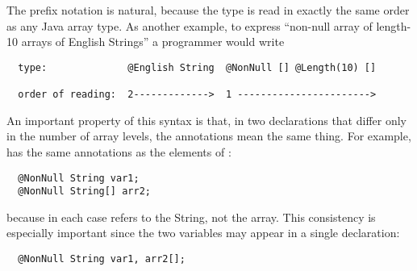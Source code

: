 \documentclass[10pt]{article}
\newcommand{\preverbnegspace}{\vspace{-5pt}}
\begin{document}
The prefix notation is natural, because the type is read in exactly
the same order as any Java array type.  As another example, to express
``non-null array of length-10 arrays of English Strings'' a programmer
would write

\begin{Verbatim}
  type:              @English String  @NonNull [] @Length(10) []

  order of reading:  2------------->  1 ----------------------->
\end{Verbatim}




An important property of this syntax is that, in two declarations that
differ only in the number of array levels, the annotations mean the same
thing.  For example,  has
the same annotations as the elements of :

\preverbnegspace
\begin{Verbatim}
  @NonNull String var1;
  @NonNull String[] arr2;
\end{Verbatim}

\noindent
because in each case  refers to the String, not the array.
This consistency is especially important since the two variables may appear in a single
declaration:

\preverbnegspace
\begin{Verbatim}
  @NonNull String var1, arr2[];
\end{Verbatim}

% 



\end{document}
